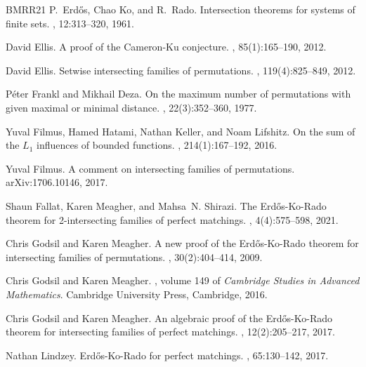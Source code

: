 \documentclass[10pt,a4paper]{amsart}
\theoremstyle{definition}
\begin{document}
\begin{thebibliography}{BMRR21}
P.~Erd\H{o}s, Chao Ko, and R.~Rado.
\newblock Intersection theorems for systems of finite sets.
, 12:313--320, 1961.

David Ellis.
\newblock A proof of the {C}ameron-{K}u conjecture.
, 85(1):165--190, 2012.

David Ellis.
\newblock Setwise intersecting families of permutations.
, 119(4):825--849, 2012.

P\'{e}ter Frankl and Mikhail Deza.
\newblock On the maximum number of permutations with given maximal or minimal
  distance.
, 22(3):352--360, 1977.

Yuval Filmus, Hamed Hatami, Nathan Keller, and Noam Lifshitz.
\newblock On the sum of the {$L_1$} influences of bounded functions.
, 214(1):167--192, 2016.

Yuval Filmus.
\newblock A comment on intersecting families of permutations.
\newblock arXiv:1706.10146, 2017.

Shaun Fallat, Karen Meagher, and Mahsa~N. Shirazi.
\newblock The {E}rd{\H{o}}s-{K}o-{R}ado theorem for 2-intersecting families of
  perfect matchings.
, 4(4):575--598, 2021.

Chris Godsil and Karen Meagher.
\newblock A new proof of the {E}rd{\H{o}}s-{K}o-{R}ado theorem for intersecting
  families of permutations.
, 30(2):404--414, 2009.

Chris Godsil and Karen Meagher.
, volume
  149 of {\em Cambridge Studies in Advanced Mathematics}.
\newblock Cambridge University Press, Cambridge, 2016.

Chris Godsil and Karen Meagher.
\newblock An algebraic proof of the {E}rd{\H{o}}s-{K}o-{R}ado theorem for
  intersecting families of perfect matchings.
, 12(2):205--217, 2017.

Nathan Lindzey.
\newblock Erd{\H{o}}s-{K}o-{R}ado for perfect matchings.
, 65:130--142, 2017.


\end{thebibliography}
\end{document}
